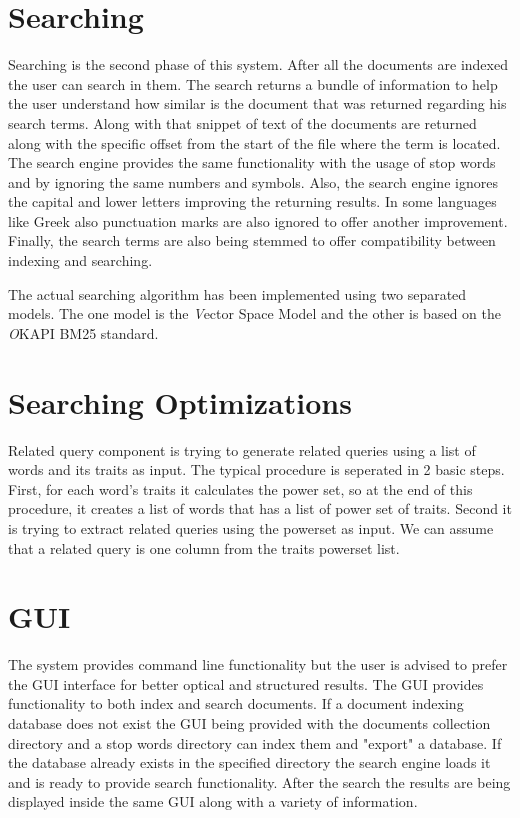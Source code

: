 \documentclass[letterpaper,twocolumn,10pt]{article}
\begin{document}
\section{Searching}
Searching is the second phase of this system. After all the documents are indexed the user can search in them. The search returns a bundle of information to help the user understand how similar is the document that was returned regarding his search terms. Along with that snippet of text of the documents are returned along with the specific offset from the start of the file where the term is located. The search engine provides the same functionality with the usage of stop words and by ignoring the same numbers and symbols. Also, the search engine ignores the capital and lower letters improving the returning results. In some languages like Greek also punctuation marks are also ignored to offer another improvement. Finally, the search terms are also being stemmed to offer compatibility between indexing and searching.

The actual searching algorithm has been implemented using two separated models. The one model is the {\emph Vector Space} Model and the other is based on the {\emph OKAPI BM25} standard.

\section{Searching Optimizations}
Related query component is trying to generate related queries using a list of words and its traits as input. The typical procedure is seperated in 2 basic steps. First, for each word's traits it calculates the power set, so at the end of this procedure, it creates a list of words that has a list of power set of traits. Second it is trying to extract related queries using the powerset as input. We can assume that a related query is one column from the traits powerset list.

\section{GUI}
The system provides command line functionality but the user is advised to prefer the GUI interface for better optical and structured results. The GUI provides functionality to both index and search documents. If a document indexing database does not exist the GUI being provided with the documents collection directory and a stop words directory can index them and "export" a database. If the database already exists in the specified directory the search engine loads it and is ready to provide search functionality. After the search the results are being displayed inside the same GUI along with a variety of information.
\end{document}
